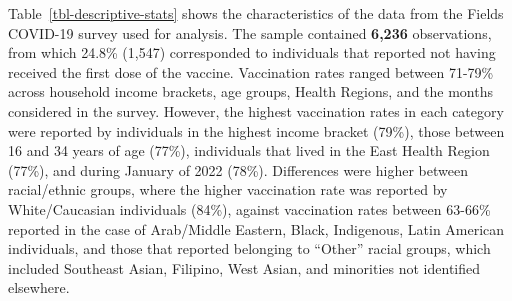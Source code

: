 \documentclass[
  letterpaper,
  DIV=11,
  numbers=noendperiod]{scrartcl}
\begin{document}
Table~\ref{tbl-descriptive-stats} shows the characteristics of the data
from the Fields COVID-19 survey used for analysis. The sample contained
\textbf{6,236} observations, from which 24.8\% (1,547) corresponded to
individuals that reported not having received the first dose of the
vaccine. Vaccination rates ranged between 71-79\% across household
income brackets, age groups, Health Regions, and the months considered
in the survey. However, the highest vaccination rates in each category
were reported by individuals in the highest income bracket (79\%), those
between 16 and 34 years of age (77\%), individuals that lived in the
East Health Region (77\%), and during January of 2022 (78\%).
Differences were higher between racial/ethnic groups, where the higher
vaccination rate was reported by White/Caucasian individuals (84\%),
against vaccination rates between 63-66\% reported in the case of
Arab/Middle Eastern, Black, Indigenous, Latin American individuals, and
those that reported belonging to ``Other'' racial groups, which included
Southeast Asian, Filipino, West Asian, and minorities not identified
elsewhere.
\end{document}
